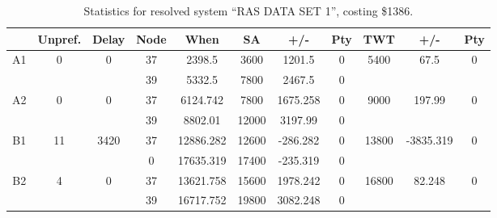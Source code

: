 \begin{sidewaystable}
\footnotesize
\caption{Statistics for resolved system ``RAS DATA SET 1'', costing \$1386.}
\centering
\begin{tabular}{c||c|c||c|c|c|c|c||c|c|c}
  \hline \hline
  &
  Unpref. & 
  Delay &
  Node &
  When &
  SA &
  +/- &
  Pty &
  TWT &
  +/- &
  Pty \\
      \hline
      \multirow{2}{*}{A1} &
      \multirow{2}{*}{0} &
      \multirow{2}{*}{0} &
      37 &
      2398.5 &
      3600 &
        1201.5 &
        0 &
      \multirow{2}{*}{5400} &
        \multirow{2}{*}{67.5} &
        \multirow{2}{*}{0}
      \\
      \cline{4-8}
       &
       &
       &
      39 &
      5332.5 &
      7800 &
        2467.5 &
        0 &
      
         &
        
      \\
      \hline
      \multirow{2}{*}{A2} &
      \multirow{2}{*}{0} &
      \multirow{2}{*}{0} &
      37 &
      6124.742 &
      7800 &
        1675.258 &
        0 &
      \multirow{2}{*}{9000} &
        \multirow{2}{*}{197.99} &
        \multirow{2}{*}{0}
      \\
      \cline{4-8}
       &
       &
       &
      39 &
      8802.01 &
      12000 &
        3197.99 &
        0 &
      
         &
        
      \\
      \hline
      \multirow{2}{*}{B1} &
      \multirow{2}{*}{11} &
      \multirow{2}{*}{3420} &
      37 &
      12886.282 &
      12600 &
        -286.282 &
        0 &
      \multirow{2}{*}{13800} &
        \multirow{2}{*}{-3835.319} &
        \multirow{2}{*}{0}
      \\
      \cline{4-8}
       &
       &
       &
      0 &
      17635.319 &
      17400 &
        -235.319 &
        0 &
      
         &
        
      \\
      \hline
      \multirow{2}{*}{B2} &
      \multirow{2}{*}{4} &
      \multirow{2}{*}{0} &
      37 &
      13621.758 &
      15600 &
        1978.242 &
        0 &
      \multirow{2}{*}{16800} &
        \multirow{2}{*}{82.248} &
        \multirow{2}{*}{0}
      \\
      \cline{4-8}
       &
       &
       &
      39 &
      16717.752 &
      19800 &
        3082.248 &
        0 &
      

\end{tabular}
\end{sidewaystable}
